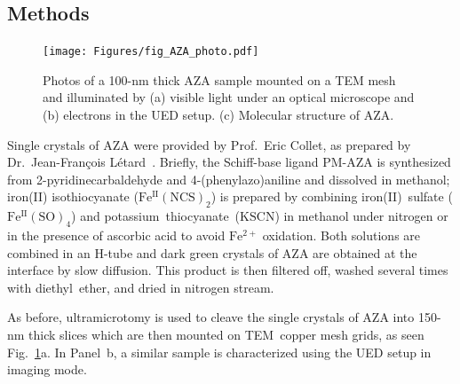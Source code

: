 


\subsection{Methods}

\begin{figure}[ht!]
  \centering
  \texttt{[image: Figures/fig\_AZA\_photo.pdf]}
  \caption[Photos of AZA sample.]{
    Photos of a 100-nm thick AZA sample mounted on a TEM mesh
    and illuminated by (a) visible light under an optical microscope
    and (b) electrons in the UED setup.
    (c) Molecular structure of AZA.
  }
  \label{fig: AZA-photo}
\end{figure}

Single crystals of AZA were provided by Prof.~Eric Collet,
as prepared by Dr.~Jean-Fran\c{c}ois L\'{e}tard~\cite{Letard1997, Letard1998}.
Briefly, the Schiff-base ligand PM-AZA is synthesized from 2-pyridinecarbaldehyde
and 4-(phenylazo)aniline and dissolved in methanol;
iron(II) isothiocyanate ($\mathrm{Fe^{II}(NCS)_2}$) is prepared
by combining iron(II)~sulfate ($\mathrm{Fe^{II}(SO)_4}$)
and potassium~thiocyanate~($\mathrm{KSCN}$) in methanol under nitrogen
or in the presence of ascorbic acid to avoid $\mathrm{Fe^{2+}}$ oxidation.
Both solutions are combined in an H-tube and dark green crystals of AZA
are obtained at the interface by slow diffusion.
This product is then filtered off, washed several times with diethyl~ether,
and dried in nitrogen stream.

As before, ultramicrotomy is used to cleave
the single crystals of AZA into 150-nm thick slices which are then mounted
on TEM~copper mesh grids, as seen Fig.~\ref{fig: AZA-photo}a.
In Panel~b, a similar sample is characterized using the UED setup in imaging mode.

